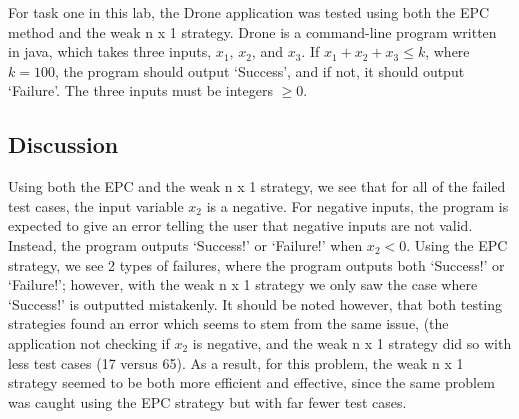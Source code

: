 For task one in this lab, the Drone application was tested using both the
EPC method and the weak n x 1 strategy. Drone is a command-line program
written in java, which takes three inputs, $x_1$, $x_2$, and $x_3$.
If $x_1 + x_2 + x_3 \leq k$, where $k=100$, the program should output
`Success', and if not, it should output `Failure'. The three inputs 
must be integers $\geq 0$. 

\subsection{Discussion}
Using both the EPC and the weak n x 1 strategy, we see that for all of the
failed test cases, the input variable $x_2$ is a negative. For negative
inputs, the program is expected to give an error telling the user that 
negative inputs are not valid. Instead, the program outputs `Success!'
or `Failure!' when $x_2 < 0$. Using the EPC strategy, we see
2 types of failures, where the program outputs both `Success!'                       
or `Failure!'; however, with the weak n x 1 strategy we only saw the case where
`Success!' is outputted mistakenly. It should be noted however, that both
testing strategies found an error which seems to stem from the same issue,
(the application not checking if $x_2$ is negative, and the weak n x 1 strategy
did so with less test cases (17 versus 65). As a result, for this problem,
the weak n x 1 strategy seemed to be both more efficient and effective,
since the same problem was caught using the EPC strategy but with far fewer
test cases.
